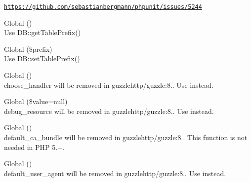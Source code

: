 \begin{DoxyRefList}
\label{deprecated__deprecated000299}%
%
\href{https://github.com/sebastianbergmann/phpunit/issues/5244}{\texttt{https\+://github.\+com/sebastianbergmann/phpunit/issues/5244}}  
\item[Global \doxylink{class_illuminate_1_1_database_1_1_grammar_a21e18eb7091f0ae3098c37a4c68fd5dc}{Grammar\+::get\+Table\+Prefix} ()]\hfill \\
\label{deprecated__deprecated000108}%
%
Use DB\+::get\+Table\+Prefix() 
\item[Global \doxylink{class_illuminate_1_1_database_1_1_grammar_a7c772d6ec3e6b8df8404cb1dc35f7760}{Grammar\+::set\+Table\+Prefix} (\$prefix)]\hfill \\
\label{deprecated__deprecated000109}%
%
Use DB\+::set\+Table\+Prefix() 
\item[Global \doxylink{namespace_guzzle_http_aa0c64d2c59c04841ad45dee17fda6656}{Guzzle\+Http\+::choose\+\_\+handler} ()]\hfill \\
\label{deprecated__deprecated000085}%
%
choose\+\_\+handler will be removed in guzzlehttp/guzzle\+:8.. Use  instead.  
\item[Global \doxylink{namespace_guzzle_http_a6f80794616c2fbd5400985f74672d713}{Guzzle\+Http\+::debug\+\_\+resource} (\$value=null)]\hfill \\
\label{deprecated__deprecated000084}%
%
debug\+\_\+resource will be removed in guzzlehttp/guzzle\+:8.. Use  instead.  
\item[Global \doxylink{namespace_guzzle_http_aeaed8c70455d561e9de7ca3029dc79f9}{Guzzle\+Http\+::default\+\_\+ca\+\_\+bundle} ()]\hfill \\
\label{deprecated__deprecated000087}%
%
default\+\_\+ca\+\_\+bundle will be removed in guzzlehttp/guzzle\+:8.. This function is not needed in PHP 5.+.  
\item[Global \doxylink{namespace_guzzle_http_aac383f8a054cf78bd8c997de5ed8ee7f}{Guzzle\+Http\+::default\+\_\+user\+\_\+agent} ()]\hfill \\
\label{deprecated__deprecated000086}%
%
default\+\_\+user\+\_\+agent will be removed in guzzlehttp/guzzle\+:8.. Use  instead.  

\end{DoxyRefList}
